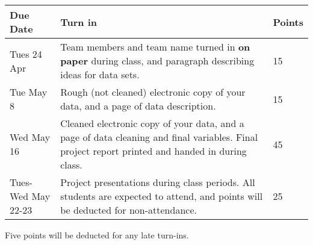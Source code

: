 \documentclass{article}
\begin{document}
\begin{center}
\bigskip
\begin{tabular}{l|p{10cm}|l}
  {\bf Due Date} & {\bf Turn in}  & {\bf Points} \\\hline
  Tues  24 Apr & Team members and team name turned in {\bf on paper} during class, and paragraph describing ideas for data sets. 
  & 15\\\hline
 Tue  May 8 & Rough (not cleaned) electronic copy of your data, and a page of data description. & 15 \\\hline
 Wed May 16 & Cleaned electronic copy of your data, and a page of data cleaning and final variables. Final project report printed and handed in during class. & 45 \\\hline
  Tues-Wed May 22-23 & Project presentations during class periods. All students are expected to attend, and points will be deducted for non-attendance. & 25\\\hline
\end{tabular}
\end{center}
\bigskip

Five points will be deducted for any late turn-ins.
\end{document}
